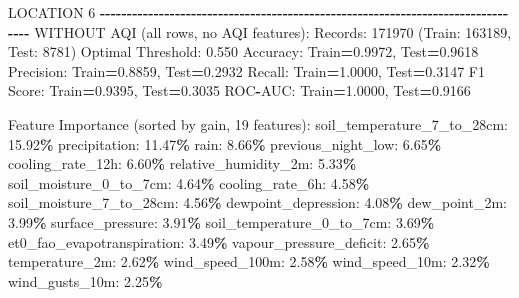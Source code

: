\documentclass[
  letterpaper,
  DIV=11,
  numbers=noendperiod]{scrartcl}
\newenvironment{Shaded}{\begin{snugshade}}{\end{snugshade}}
\newcommand{\BuiltInTok}[1]{#1}
\newcommand{\DecValTok}[1]{\textcolor[rgb]{0.00,0.00,0.81}{#1}}
\newcommand{\FloatTok}[1]{\textcolor[rgb]{0.00,0.00,0.81}{#1}}
\newcommand{\NormalTok}[1]{#1}
\newcommand{\OperatorTok}[1]{\textcolor[rgb]{0.81,0.36,0.00}{\textbf{#1}}}
\begin{document}
\begin{Shaded}
\begin{Highlighting}[]
\NormalTok{LOCATION }\DecValTok{6}
\OperatorTok{{-}{-}{-}{-}{-}{-}{-}{-}{-}{-}{-}{-}{-}{-}{-}{-}{-}{-}{-}{-}{-}{-}{-}{-}{-}{-}{-}{-}{-}{-}{-}{-}{-}{-}{-}{-}{-}{-}{-}{-}{-}{-}{-}{-}{-}{-}{-}{-}{-}{-}{-}{-}{-}{-}{-}{-}{-}{-}{-}{-}{-}{-}{-}{-}{-}{-}{-}{-}{-}{-}{-}{-}{-}{-}{-}{-}{-}{-}{-}{-}}
\NormalTok{WITHOUT AQI (}\BuiltInTok{all}\NormalTok{ rows, no AQI features):}
\NormalTok{  Records: }\DecValTok{171970}\NormalTok{ (Train: }\DecValTok{163189}\NormalTok{, Test: }\DecValTok{8781}\NormalTok{)}
\NormalTok{  Optimal Threshold: }\FloatTok{0.550}
\NormalTok{  Accuracy: Train}\OperatorTok{=}\FloatTok{0.9972}\NormalTok{, Test}\OperatorTok{=}\FloatTok{0.9618}
\NormalTok{  Precision: Train}\OperatorTok{=}\FloatTok{0.8859}\NormalTok{, Test}\OperatorTok{=}\FloatTok{0.2932}
\NormalTok{  Recall: Train}\OperatorTok{=}\FloatTok{1.0000}\NormalTok{, Test}\OperatorTok{=}\FloatTok{0.3147}
\NormalTok{  F1 Score: Train}\OperatorTok{=}\FloatTok{0.9395}\NormalTok{, Test}\OperatorTok{=}\FloatTok{0.3035}
\NormalTok{  ROC}\OperatorTok{{-}}\NormalTok{AUC: Train}\OperatorTok{=}\FloatTok{1.0000}\NormalTok{, Test}\OperatorTok{=}\FloatTok{0.9166}

\NormalTok{  Feature Importance (}\BuiltInTok{sorted}\NormalTok{ by gain, }\DecValTok{19}\NormalTok{ features):}
\NormalTok{    soil\_temperature\_7\_to\_28cm: }\FloatTok{15.92}\OperatorTok{\%}
\NormalTok{    precipitation: }\FloatTok{11.47}\OperatorTok{\%}
\NormalTok{    rain: }\FloatTok{8.66}\OperatorTok{\%}
\NormalTok{    previous\_night\_low: }\FloatTok{6.65}\OperatorTok{\%}
\NormalTok{    cooling\_rate\_12h: }\FloatTok{6.60}\OperatorTok{\%}
\NormalTok{    relative\_humidity\_2m: }\FloatTok{5.33}\OperatorTok{\%}
\NormalTok{    soil\_moisture\_0\_to\_7cm: }\FloatTok{4.64}\OperatorTok{\%}
\NormalTok{    cooling\_rate\_6h: }\FloatTok{4.58}\OperatorTok{\%}
\NormalTok{    soil\_moisture\_7\_to\_28cm: }\FloatTok{4.56}\OperatorTok{\%}
\NormalTok{    dewpoint\_depression: }\FloatTok{4.08}\OperatorTok{\%}
\NormalTok{    dew\_point\_2m: }\FloatTok{3.99}\OperatorTok{\%}
\NormalTok{    surface\_pressure: }\FloatTok{3.91}\OperatorTok{\%}
\NormalTok{    soil\_temperature\_0\_to\_7cm: }\FloatTok{3.69}\OperatorTok{\%}
\NormalTok{    et0\_fao\_evapotranspiration: }\FloatTok{3.49}\OperatorTok{\%}
\NormalTok{    vapour\_pressure\_deficit: }\FloatTok{2.65}\OperatorTok{\%}
\NormalTok{    temperature\_2m: }\FloatTok{2.62}\OperatorTok{\%}
\NormalTok{    wind\_speed\_100m: }\FloatTok{2.58}\OperatorTok{\%}
\NormalTok{    wind\_speed\_10m: }\FloatTok{2.32}\OperatorTok{\%}
\NormalTok{    wind\_gusts\_10m: }\FloatTok{2.25}\OperatorTok{\%}


\end{Highlighting}
\end{Shaded}
\end{document}
